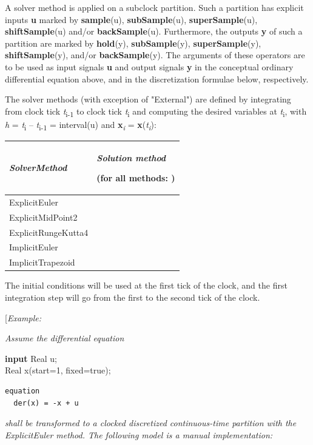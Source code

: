 \documentclass[10pt,a4paper]{report}
\begin{document}
A solver method is applied on a subclock partition. Such a partition has
explicit inputs \textbf{u} marked by \textbf{sample}(u),
\textbf{subSample}(u), \textbf{superSample}(u), \textbf{shiftSample}(u)
and/or \textbf{backSample}(u). Furthermore, the outputs \textbf{y} of
such a partition are marked by \textbf{hold}(y), \textbf{subSample}(y),
\textbf{superSample}(y), \textbf{shiftSample}(y), and/or
\textbf{backSample}(y). The arguments of these operators are to be used
as input signals \textbf{u} and output signals \textbf{y} in the
conceptual ordinary differential equation above, and in the
discretization formulae below, respectively.

The solver methods (with exception of "External") are defined by
integrating from clock tick \emph{t}\textsubscript{i-1} to clock tick
\emph{t}\textsubscript{i} and computing the desired variables at
\emph{t}\textsubscript{i}, with \emph{h} = \emph{t}\textsubscript{i} --
\emph{t}\textsubscript{i-1} = interval(u) and
\textbf{x}\emph{\textsubscript{i}} =
\textbf{x}(\emph{t\textsubscript{i}}):

\begin{longtable}[]{@{}ll@{}}
\hline
\begin{minipage}[b]{0.47\columnwidth}\raggedright
\emph{SolverMethod}\strut
\end{minipage} & \begin{minipage}[b]{0.47\columnwidth}\raggedright
\emph{Solution method}

(for all methods: )
\end{minipage}\\ \hline

\endhead
ExplicitEuler &\\ \hline
ExplicitMidPoint2 &\\ \hline
ExplicitRungeKutta4 &\\ \hline
ImplicitEuler &\\ \hline
ImplicitTrapezoid &\\ \hline

\end{longtable}

The initial conditions will be used at the first tick of the clock, and
the first integration step will go from the first to the second tick of
the clock.

{[}\emph{Example:}

\emph{Assume the differential equation}

\textbf{input} Real u;\\
Real x(start=1, fixed=true);\\
\begin{lstlisting}[language=modelica]
equation
  der(x) = -x + u
\end{lstlisting}
\emph{shall be transformed to a clocked discretized continuous-time
partition with the ExplicitEuler method. The following model is a manual
implementation:}
\end{document}
